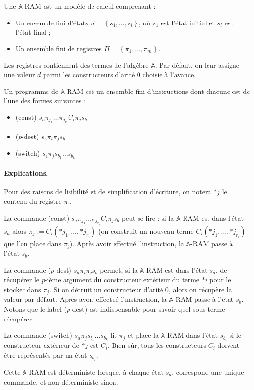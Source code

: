 \documentclass{report}
\newcommand{\bbA}{\mathbb{A}}
\begin{document}
		\begin{definition}
			\label{def:A_RAM}
			Une $\bbA$-RAM est un modèle de calcul comprenant :
			
			\begin{itemize}[itemsep=-1mm]
				\item 	Un ensemble fini d'états $S = \left\lbrace s_1, \dots, s_l \right\rbrace$, où $s_1$ est l'état initial et $s_l$ est l'état final ;
				\item 	Un ensemble fini de registres $\Pi = \left\lbrace \pi_1, \dots, \pi_m \right\rbrace$.
			\end{itemize}
			
			Les registres contiennent des termes de l'algèbre $\bbA$. Par défaut, on leur assigne une valeur $d$ parmi les constructeurs d'arité $0$ choisie à l'avance.
			
			Un programme de $\bbA$-RAM est un ensemble fini d'instructions dont chacune est de l'une des formes suivantes :
			
			\begin{itemize}[itemsep=-1mm]
				\item 	(const)			$s_a \pi_{j_1} \dots \pi_{j_{r_i}} C_i \pi_j s_b$
				\item	($p$-dest)		$s_a \pi_i \pi_j s_b$
				\item	(switch)		$s_a \pi_j s_{b_1} \dots s_{b_k}$
			\end{itemize}
			
			
			\paragraph{Explications.}
			Pour des raisons de lisibilité et de simplification d'écriture, on notera $*j$ le contenu du registre $\pi_j$. 
			
			La commande (const) $s_a \pi_{j_1} \dots \pi_{j_{r_i}} C_i \pi_j s_b$ peut se lire : si la $\bbA$-RAM est dans l'état $s_a$ alors $\pi_j := C_i\left( *j_1, \dots, *j_{r_i}\right)$ (on construit un nouveau terme $C_i\left( *j_1, \dots, *j_{r_i} \right)$ que l'on place dans $\pi_j$). Après avoir effectué l'instruction, la $\bbA$-RAM passe à l'état $s_b$.

			La commande ($p$-dest) $s_a \pi_i \pi_j s_b$ permet, si la $\bbA$-RAM est dans l'état $s_a$, de récupérer le $p$-ième argument du constructeur extérieur du terme $*i$ pour le stocker dans $\pi_j$. Si on détruit un constructeur d'arité $0$, alors on récupère la valeur par défaut. Après avoir effectué l'instruction, la $\bbA$-RAM passe à l'état $s_b$. Notons que le label ($p$-dest) est indispensable pour savoir quel sous-terme récupérer. 
			
			La commande (switch) $s_a \pi_j s_{b_1} \dots s_{b_k}$ lit $\pi_j$ et place la $\bbA$-RAM dans l'état $s_{b_i}$ si le constructeur extérieur de $*j$ est $C_i$. Bien sûr, tous les constructeurs $C_i$ doivent être représentés par un état $s_{b_i}$.
			
			Cette $\bbA$-RAM est déterministe lorsque, à chaque état $s_a$, correspond une unique commande, et non-déterministe sinon.
		\end{definition}
		
\end{document}
